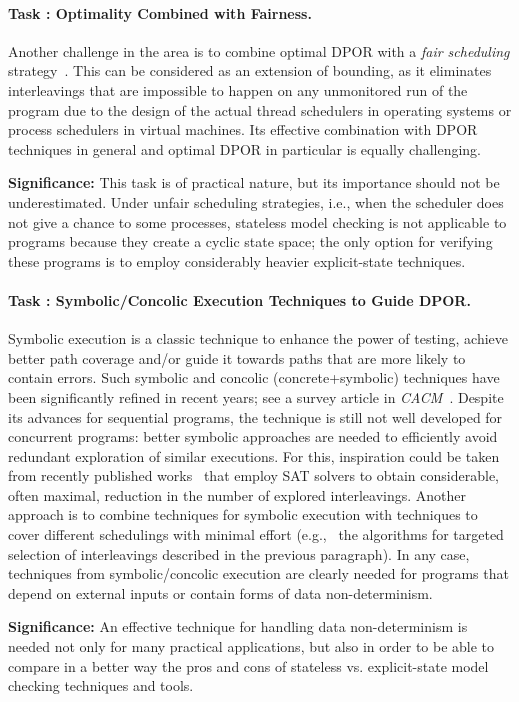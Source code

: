 \documentclass[11pt]{article}
\newcounter{Task}
\newcommand{\task}[1]{\addtocounter{Task}{1}\paragraph{Task \theTask: #1}}
\newcommand{\significance}[1]{\vspace*{-0.5em}%
  \begin{quoting}\noindent\textbf{Significance:} #1\end{quoting}}
\newcommand{\myparagraph}{}
\let\myparagraph=\paragraph
\renewcommand{\paragraph}{\vspace{-3mm}\myparagraph}
\newcommand{\eg}{e.\/g.,\ }
\begin{document}
{\task{Optimality Combined with Fairness.}
Another challenge in the area is to combine optimal DPOR with a
\emph{fair scheduling} strategy~\cite{FairStatelessMC@PLDI-08}. This
can be considered as an extension of bounding, as it eliminates
interleavings that are impossible to happen on any unmonitored run of
the program due to the design of the actual thread schedulers in
operating systems or process schedulers in virtual machines.  Its
effective combination with DPOR techniques in general and optimal
DPOR in particular is equally challenging.

\significance{This task is of practical nature, but its importance should
  not be underestimated.  Under unfair scheduling strategies, i.e., when
  the scheduler does not give a chance to some processes, stateless model
  checking is not applicable to programs because they create a cyclic state
  space; the only option for verifying these programs is to employ
  considerably heavier explicit-state techniques.}

\task{Symbolic/Concolic Execution Techniques to Guide DPOR.}
Symbolic execution is a classic technique to enhance the power of testing,
achieve better path coverage and/or guide it towards paths that are more
likely to contain errors. Such symbolic and concolic (concrete+symbolic)
techniques have been significantly refined in recent years; see a survey
article in \textit{CACM}~\cite{SymbolicTesting@CACM-13}.
Despite its advances for sequential programs, the
technique is still not well developed for concurrent programs: better
symbolic approaches are needed to efficiently avoid redundant
exploration of similar executions. For this, inspiration could be
taken from recently published
works~\cite{MCR@PLDI-15,SATCheck@OOPSLA-15,MCR-TSO@OOPSLA-16} that employ
SAT solvers to obtain considerable, often maximal, reduction in the number
of explored interleavings.
%
Another approach is to combine techniques for symbolic execution with
techniques to cover different schedulings with minimal effort (\eg
the algorithms for targeted selection of interleavings described in
the previous paragraph).
%
In any case, techniques from symbolic/concolic execution are clearly needed
for programs that depend on external inputs or contain forms of data
non-determinism.

\significance{An effective technique for handling data non-determinism is
  needed not only for many practical applications, but also in order to be
  able to compare in a better way the pros and cons of stateless vs.\/
  explicit-state model checking techniques and tools.}
}
\end{document}
